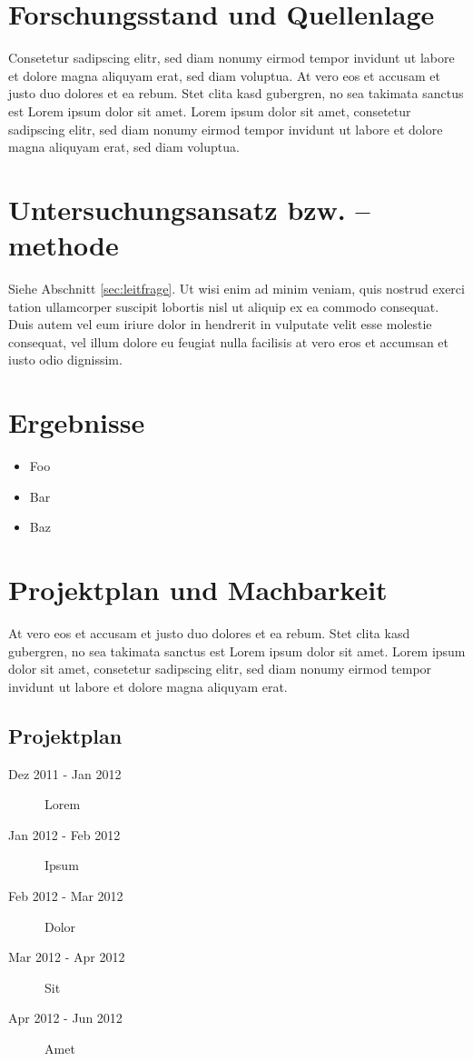 \section{Forschungsstand und Quellenlage}
    \label{sec:forschungsstand}

    Consetetur sadipscing elitr, sed diam nonumy eirmod tempor invidunt ut labore et dolore magna aliquyam erat, sed diam voluptua. At vero eos et accusam et justo duo dolores et ea rebum. Stet clita kasd gubergren, no sea takimata sanctus est Lorem ipsum dolor sit amet. Lorem ipsum dolor sit amet, consetetur sadipscing elitr, sed diam nonumy eirmod tempor invidunt ut labore et dolore magna aliquyam erat, sed diam voluptua.

\section{Untersuchungsansatz bzw. –methode}

    Siehe Abschnitt \ref{sec:leitfrage}. Ut wisi enim ad minim veniam, quis nostrud exerci tation ullamcorper suscipit lobortis nisl ut aliquip ex ea commodo consequat. Duis autem vel eum iriure dolor in hendrerit in vulputate velit esse molestie consequat, vel illum dolore eu feugiat nulla facilisis at vero eros et accumsan et iusto odio dignissim.

\section{Ergebnisse}
    \label{sec:ergebnisse}

    \begin{itemize}
        \item Foo
        \item Bar
        \item Baz
    \end{itemize}

\section{Projektplan und Machbarkeit}
    \label{sec:projektplan}

    At vero eos et accusam et justo duo dolores et ea rebum. Stet clita kasd gubergren, no sea takimata sanctus est Lorem ipsum dolor sit amet. Lorem ipsum dolor sit amet, consetetur sadipscing elitr, sed diam nonumy eirmod tempor invidunt ut labore et dolore magna aliquyam erat.

    \subsection*{Projektplan}

    \begin{description}
        \item[Dez 2011 - Jan 2012] Lorem
        \item[Jan 2012 - Feb 2012] Ipsum
        \item[Feb 2012 - Mar 2012] Dolor
        \item[Mar 2012 - Apr 2012] Sit
        \item[Apr 2012 - Jun 2012] Amet
    \end{description}